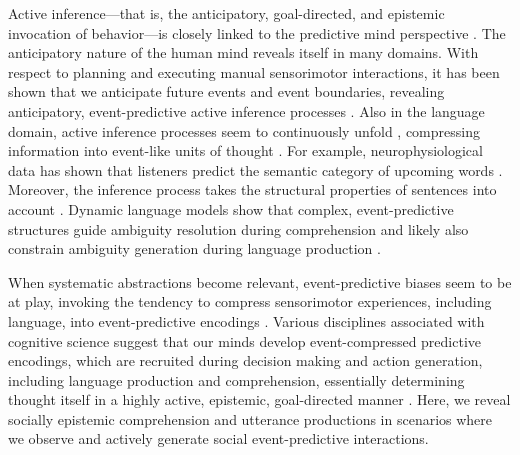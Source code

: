 \documentclass[10pt,a4paper]{article}
\begin{document}

\noindent Active inference---that is, the anticipatory, goal-directed, and epistemic invocation of behavior---is
closely linked to the predictive mind perspective \cite{Friston:2015,Hohwy:2013,Clark:2016}. 
The anticipatory nature of the human mind reveals itself in many domains.
With respect to planning and executing manual sensorimotor interactions, 
it has been shown that we anticipate future events and event boundaries, revealing anticipatory, event-predictive active inference processes \cite{belardinelli2016s, belardinelli2018mental,Friston:2015,Hayhoe:2003,lohmann2019hands}.
Also in the language domain, active inference processes seem to continuously unfold \cite{Christiansen:2016}, compressing information into event-like units of thought \cite{Baldwin:2019tsi,Gaerdenfors:2014}.
For example, neurophysiological data has shown that listeners predict the semantic category of upcoming words \cite{federmeier2002picture}.
Moreover, the inference process takes the structural properties of sentences into account \cite{levy2008expectation}.
Dynamic language models show that complex, event-predictive structures guide ambiguity resolution during comprehension and likely also constrain ambiguity generation during language production \cite{Elman:2019}. 

When systematic abstractions become relevant, event-predictive biases seem to be at play, invoking the tendency to compress sensorimotor experiences, including language, into event-predictive encodings \cite{Baldwin:2019tsi,Butz:2016,Butz:2017a,DuBrow:2019tsi}.
Various disciplines associated with cognitive science suggest that our minds develop event-compressed predictive encodings, which are recruited during decision making and action generation, including language production and comprehension, essentially determining thought itself in a highly active, epistemic, goal-directed manner  \cite{Baldwin:2019tsi,DuBrow:2019tsi,Elsner:2019tsi,Knott:2019tsi,Papafragou:2019tsi,Zacks:2019tsi}.
Here, we reveal socially epistemic comprehension and utterance productions in scenarios where we observe and actively generate social event-predictive interactions.
\end{document}

